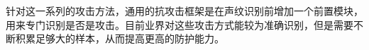 \documentclass[graybox,envcountchap,sectrefs]{svmono}
\begin{document}
针对这一系列的攻击方法，通用的抗攻击框架是在声纹识别前增加一个前置模块，用来专门识别是否是攻击。目前业界对这些攻击方式能较为准确识别，但是需要不断积累足够大的样本，从而提高更高的防护能力。





\backmatter%
%
%
\printindex

\end{document}
